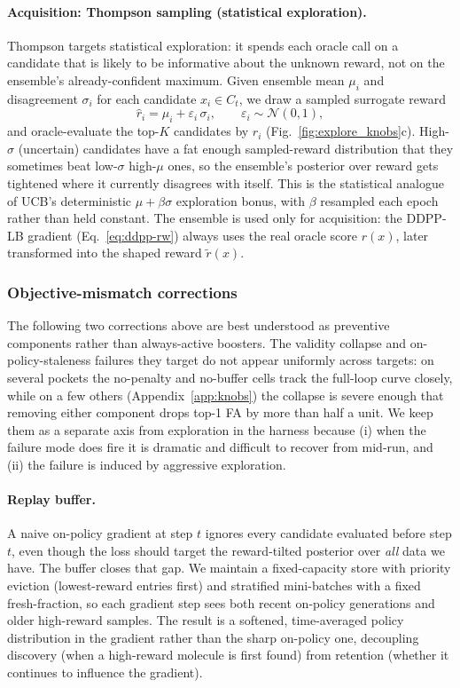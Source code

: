 \documentclass{article}
\begin{document}
\paragraph{Acquisition: Thompson sampling (statistical exploration).} Thompson targets statistical exploration: it spends each oracle call on a candidate that is likely to be informative about the unknown reward, not on the ensemble's already-confident maximum. Given ensemble mean $\mu_i$ and disagreement $\sigma_i$ for each candidate $x_i\in C_t$, we draw a sampled surrogate reward
\[
\hat r_i = \mu_i + \varepsilon_i\, \sigma_i,
\qquad \varepsilon_i \sim \mathcal{N}(0, 1),
\]
and oracle-evaluate the top-$K$ candidates by $\hat r_i$ (Fig.~\ref{fig:explore_knobs}c). High-$\sigma$ (uncertain) candidates have a fat enough sampled-reward distribution that they sometimes beat low-$\sigma$ high-$\mu$ ones, so the ensemble's posterior over reward gets tightened where it currently disagrees with itself. This is the statistical analogue of UCB's deterministic $\mu + \beta\sigma$ exploration bonus, with $\beta$ resampled each epoch rather than held constant. The ensemble is used only for acquisition: the DDPP-LB gradient (Eq.~\ref{eq:ddpp-rw}) always uses the real oracle score $r(x)$, later transformed into the shaped reward $\tilde r(x)$.

\subsubsection{Objective-mismatch corrections}\label{sec:design-objective}

The following two corrections above are best understood as preventive components rather than always-active boosters. The validity collapse and on-policy-staleness failures they target do not appear uniformly across targets: on several pockets the no-penalty and no-buffer cells track the full-loop curve closely, while on a few others (Appendix~\ref{app:knobs}) the collapse is severe enough that removing either component drops top-1 FA by more than half a unit. We keep them as a separate axis from exploration in the harness because (i) when the failure mode does fire it is dramatic and difficult to recover from mid-run, and (ii) the failure is induced by aggressive exploration.


\paragraph{Replay buffer.} A naive on-policy gradient at step $t$ ignores every candidate evaluated before step $t$, even though the loss should target the reward-tilted posterior over \emph{all} data we have. The buffer closes that gap. We maintain a fixed-capacity store with priority eviction (lowest-reward entries first) and stratified mini-batches with a fixed fresh-fraction, so each gradient step sees both recent on-policy generations and older high-reward samples. The result is a softened, time-averaged policy distribution in the gradient rather than the sharp on-policy one, decoupling discovery (when a high-reward molecule is first found) from retention (whether it continues to influence the gradient).
\end{document}
